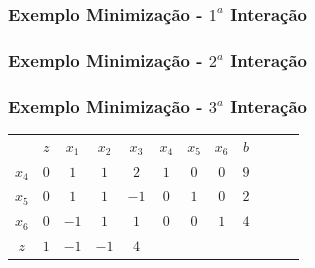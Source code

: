\begin{frame}
	{
	\frametitle{Exemplo Minimização - $1^a$ Interação}
	}
	{
		\frametitle{Exemplo Minimização - $2^a$ Interação}
	}
	{
		\frametitle{Exemplo Minimização - $3^a$ Interação}
	}


	{
	\begin{table}
		\begin{tabular}{c c c c c c c c c c c c}
			& \cellcolor{blue!80} \color{white} $ \scriptstyle z$
			& \cellcolor{blue!80} \color{white} $ \scriptstyle x_1$ 
			& \cellcolor{blue!80} \color{white} $ \scriptstyle x_2$
			& \cellcolor{blue!80} \color{white} $ \scriptstyle x_3$
			& \cellcolor{blue!80} \color{red} $ \scriptstyle x_4$
			& \cellcolor{blue!80} \color{red} $ \scriptstyle x_5$
			& \cellcolor{blue!80} \color{red} $ \scriptstyle x_6$ 
			& \cellcolor{blue!80} \color{white} $ \scriptstyle b$ \\
			\cellcolor{blue!80} \color{red} $ \scriptstyle x_4$
			& \cellcolor{yellow!60}  $ \scriptstyle 0$
			& \cellcolor{yellow!60}  $ \scriptstyle 1$ 
			& \cellcolor{yellow!60}  $ \scriptstyle 1$
			& \cellcolor{yellow!60}  $ \scriptstyle 2$
			& \cellcolor{yellow!60}  $ \scriptstyle 1$
			& \cellcolor{yellow!60}  $ \scriptstyle 0$
			& \cellcolor{yellow!60}  $ \scriptstyle 0$ 
			& \cellcolor{yellow!60}  $ \scriptstyle 9$ \\ 
			\cellcolor{blue!80} \color{red} $ \scriptstyle x_5$  
			& \cellcolor{yellow!60}  $ \scriptstyle 0$
			& \cellcolor{yellow!60}  $ \scriptstyle 1$ 
			& \cellcolor{yellow!60}  $ \scriptstyle 1$
			& \cellcolor{yellow!60}  $ \scriptstyle -1$
			& \cellcolor{yellow!60}  $ \scriptstyle 0$
			& \cellcolor{yellow!60}  $ \scriptstyle 1$
			& \cellcolor{yellow!60}  $ \scriptstyle 0$ 
			& \cellcolor{yellow!60}  $ \scriptstyle 2$ \\
			\cellcolor{blue!80} \color{red} $ \scriptstyle x_6$
			& \cellcolor{yellow!60}  $ \scriptstyle 0$
			& \cellcolor{yellow!60}  $ \scriptstyle -1$ 
			& \cellcolor{yellow!60}  $ \scriptstyle 1$
			& \cellcolor{yellow!60}  $ \scriptstyle 1$
			& \cellcolor{yellow!60}  $ \scriptstyle 0$
			& \cellcolor{yellow!60}  $ \scriptstyle 0$
			& \cellcolor{yellow!60}  $ \scriptstyle 1$ 
			& \cellcolor{yellow!60}  $ \scriptstyle 4$ \\
			\cellcolor{blue!80} \color{white} $ \scriptstyle z$
			& \cellcolor{yellow!60}  $ \scriptstyle 1$
			& \cellcolor{yellow!60}  $ \scriptstyle -1$ 
			& \cellcolor{yellow!60}  $ \scriptstyle -1$
			& \cellcolor{yellow!60}  $ \scriptstyle 4$

\end{tabular}
\end{table}}
\end{frame}
